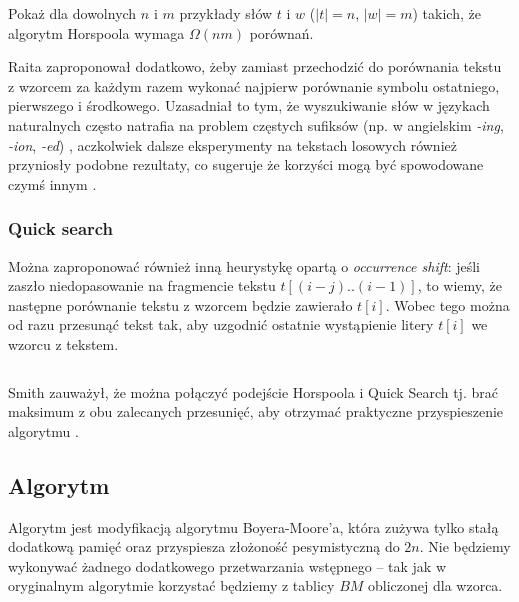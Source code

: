 \begin{problem}{}{}
  Pokaż dla dowolnych $n$ i $m$ przykłady słów $t$ i $w$ ($|t| = n$, $|w| = m$) takich, że algorytm Horspoola wymaga $\Omega(n m)$ porównań.
\end{problem}

Raita zaproponował dodatkowo, żeby zamiast przechodzić do porównania tekstu z wzorcem za każdym razem wykonać najpierw porównanie symbolu ostatniego, pierwszego i środkowego.
Uzasadniał to tym, że wyszukiwanie słów w językach naturalnych często natrafia na problem częstych sufiksów (np. w angielskim \emph{-ing}, \emph{-ion}, \emph{-ed}) \cite{raita1992tuning}, aczkolwiek dalsze eksperymenty na tekstach losowych również przyniosły podobne rezultaty, co sugeruje że korzyści mogą być spowodowane czymś innym \cite{smith1994tuning}.

\subsubsection{Quick search}

Można zaproponować również inną heurystykę opartą o \emph{occurrence shift}: jeśli zaszło niedopasowanie na fragmencie tekstu $t[(i - j)..(i - 1)]$, to wiemy, że następne porównanie tekstu z wzorcem będzie zawierało $t[i]$. Wobec tego można od razu przesunąć tekst tak, aby uzgodnić ostatnie wystąpienie litery $t[i]$ we wzorcu z tekstem.

\begin{code}
\inputminted{python}{code/exact-string-matching/quick-search.py}
\label{alg:exact-string-matching-quick-search}
\end{code}

Smith zauważył, że można połączyć podejście Horspoola i Quick Search tj. brać maksimum z obu zalecanych przesunięć, aby otrzymać praktyczne przyspieszenie algorytmu \cite{smith1991experiments}.

\subsection{Algorytm \TBM}

Algorytm \TBM jest modyfikacją algorytmu Boyera-Moore'a, która zużywa tylko stałą dodatkową pamięć oraz przyspiesza złożoność pesymistyczną do $2n$. Nie będziemy wykonywać żadnego dodatkowego przetwarzania wstępnego -- tak jak w oryginalnym algorytmie korzystać będziemy z tablicy $BM$ obliczonej dla wzorca.
  
